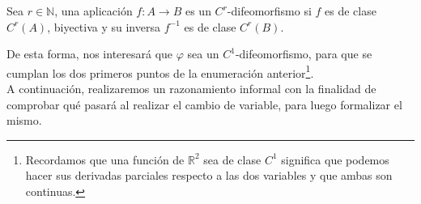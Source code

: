 \begin{definicion}[difeomorfismo]
    Sea $r\in \mathbb{N}$, una aplicación $f:A\rightarrow B$ es un \newline$C^r$-difeomorfismo si $f$ es de clase $C^r(A)$, biyectiva y su inversa $f^{-1}$ es de clase $C^r(B)$.
\end{definicion}
De esta forma, nos interesará que $\varphi$ sea un $C^1$-difeomorfismo, para que se cumplan los dos primeros puntos de la enumeración anterior\footnote{Recordamos que una función de $\mathbb{R}^2$ sea de clase $C^1$ significa que podemos hacer sus derivadas parciales respecto a las dos variables y que ambas son continuas.}.\\

A continuación, realizaremos un razonamiento informal con la finalidad de comprobar qué pasará al realizar el cambio de variable, para luego formalizar el mismo.\\

